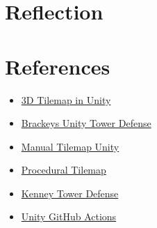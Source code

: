 \documentclass{article}
\begin{document}
\section{Reflection}
\label{Reflection}


\section{References}
\label{References}

\begin{itemize}
    \item \href{https://youtu.be/ulFc6p3hQzQ}{3D Tilemap in Unity}
    \item \href{https://www.youtube.com/playlist?list=PLPV2KyIb3jR4u5jX8za5iU1cqnQPmbzG0}{Brackeys Unity Tower Defense}
    \item \href{https://forum.unity.com/threads/how-can-i-place-a-tile-in-a-tilemap-by-script.508338/}{Manual Tilemap Unity}
    \item \href{https://blog.unity.com/technology/procedural-patterns-you-can-use-with-tilemaps-part-i}{Procedural Tilemap}
    \item \href{https://www.kenney.nl/assets/tower-defense-kit}{Kenney Tower Defense}
    \item \href{https://isaacbroyles.com/gamedev/2020/07/04/unity-github-actions.html}{Unity GitHub Actions}
\end{itemize}
\end{document}
